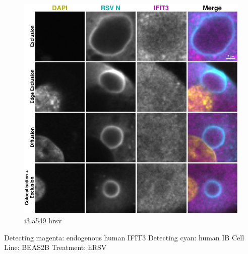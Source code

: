 \begin{figure}
    \centering
    \includegraphics[width=1\linewidth]{09. Chapter 4/Figs/02. Infection/02. IFIT3/03. a549 i3.pdf}
    \caption[i3 a549 hrsv]{i3 a549 hrsv}
    \label{fig:i3 a549 hrsv}
\end{figure}

Detecting magenta: endogenous human IFIT3 \newline
Detecting cyan: human IB \newline
Cell Line: BEAS2B \newline
Treatment: hRSV \newline

